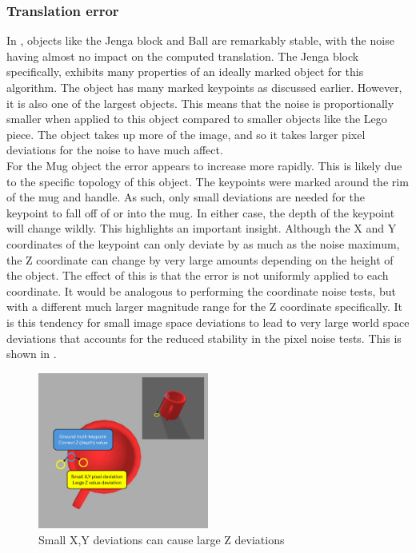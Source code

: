 \subsubsection{Translation error}
In , objects like the Jenga block and Ball are remarkably stable, with the noise having almost no impact on the computed translation. The Jenga block specifically, exhibits many properties of an ideally marked object for this algorithm. The object has many marked keypoints as discussed earlier. However, it is also one of the largest objects. This means that the noise is proportionally smaller when applied to this object compared to smaller objects like the Lego piece. The object takes up more of the image, and so it takes larger pixel deviations for the noise to have much affect.\\

For the Mug object the error appears to increase more rapidly. This is likely due to the specific topology of this object. The keypoints were marked around the rim of the mug and handle. As such, only small deviations are needed for the keypoint to fall off of or into the mug. In either case, the depth of the keypoint will change wildly. This highlights an important insight. Although the X and Y coordinates of the keypoint can only deviate by as much as the noise maximum, the Z coordinate can change by very large amounts depending on the height of the object. The effect of this is that the error is not uniformly applied to each coordinate. It would be analogous to performing the coordinate noise tests, but with a different much larger magnitude range for the Z coordinate specifically. It is this tendency for small image space deviations to lead to very large world space deviations that accounts for the reduced stability in the pixel noise tests. This is shown in .\\

\begin{figure}[h]
    \centering
    \includegraphics[width=0.5\textwidth]{figures/unstableZ.png}
    \caption{Small X,Y deviations can cause large Z deviations}
    \label{fig:unstableZ}
\end{figure}

